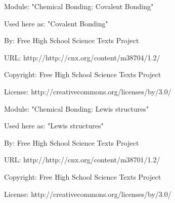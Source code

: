       \par\vspace{9pt}\noindent\begin{minipage}{\textwidth}
      Module: "Chemical Bonding: Covalent Bonding" \par\nopagebreak\noindent
      Used here as: "Covalent Bonding" \par\nopagebreak\noindent
        By: Free High School Science Texts Project\par\nopagebreak\noindent
      URL: http://http://cnx.org/content/m38704/1.2/\par\nopagebreak\noindent
      \par\nopagebreak\noindent
      Copyright: Free High School Science Texts Project\par\nopagebreak\noindent
      License:  http://creativecommons.org/licenses/by/3.0/\par\nopagebreak\noindent
      \par\end{minipage}
      \par\vspace{9pt}\noindent\begin{minipage}{\textwidth}
      Module: "Chemical Bonding: Lewis structures" \par\nopagebreak\noindent
      Used here as: "Lewis structures" \par\nopagebreak\noindent
        By: Free High School Science Texts Project\par\nopagebreak\noindent
      URL: http://http://cnx.org/content/m38701/1.2/\par\nopagebreak\noindent
      \par\nopagebreak\noindent
      Copyright: Free High School Science Texts Project\par\nopagebreak\noindent
      License:  http://creativecommons.org/licenses/by/3.0/\par\nopagebreak\noindent
      \par\end{minipage}
